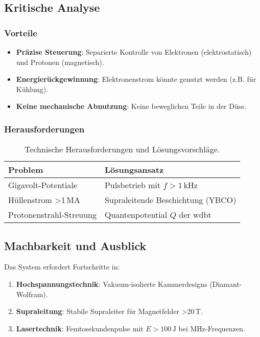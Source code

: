 \subsection{Kritische Analyse}
\subsubsection*{Vorteile}
\begin{itemize}
    \item \textbf{Präzise Steuerung}: Separierte Kontrolle von Elektronen (elektrostatisch) und Protonen (magnetisch).
    \item \textbf{Energierückgewinnung}: Elektronenstrom könnte genutzt werden (z.B. für Kühlung).
    \item \textbf{Keine mechanische Abnutzung}: Keine beweglichen Teile in der Düse.
\end{itemize}

\subsubsection*{Herausforderungen}
\begin{table}[ht]
    \centering
    \begin{tabular}{ll}
        \toprule
        \textbf{Problem} & \textbf{Lösungsansatz} \\
        \midrule
        Gigavolt-Potentiale & Pulsbetrieb mit $f > 1\,\text{kHz}$ \\
        Hüllenstrom >1\,MA & Supraleitende Beschichtung (YBCO) \\
        Protonenstrahl-Streuung & Quantenpotential $Q$ der \gls{wdbt} \\
        \bottomrule
    \end{tabular}
    \caption{Technische Herausforderungen und Lösungsvorschläge.}
    \label{tab:probleme}
\end{table}

\subsection{Machbarkeit und Ausblick}
Das System erfordert Fortschritte in:
\begin{enumerate}
    \item \textbf{Hochspannungstechnik}: Vakuum-isolierte Kammerdesigns (Diamant-Wolfram).
    \item \textbf{Supraleitung}: Stabile Supraleiter für Magnetfelder >20\,T.
    \item \textbf{Lasertechnik}: Femtosekundenpulse mit $E > 100\,\text{J}$ bei MHz-Frequenzen.
\end{enumerate}

